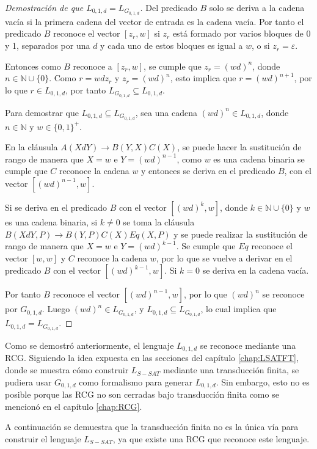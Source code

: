 \documentclass[12pt]{article}
\begin{document}
\begin{proof}[Demostración de que $L_{0,1,d}=L_{G_{0,1,d}}$]
    Del predicado $B$ solo se deriva a la cadena vacía si la primera cadena del vector de entrada es la cadena vacía. Por tanto el predicado $B$ reconoce el vector $[z_r,w]$ si $z_r$ está formado por varios bloques de 0 y 1, separados por una $d$ y cada uno de estos bloques es igual a $w$, o si $z_r=\varepsilon$.
    
    Entonces como $B$ reconoce a $[z_r,w]$, se cumple que $z_r=(wd)^n$, donde $n\in \mathbb{N}\cup \{0\}$. Como $r=wdz_r$ y $z_r=(wd)^n$, esto implica que $r=(wd)^{n+1}$, por lo que $r\in L_{0,1,d}$, por tanto $L_{G_{0,1,d}}\subseteq L_{0,1,d}$.
    
    Para demostrar que $L_{0,1,d}\subseteq L_{G_{0,1,d}}$, sea una cadena $(wd)^n\in L_{0,1,d}$, donde $n\in \mathbb{N}$ y $w \in \{0,1\}^+$.
    
    En la cláusula $A(XdY)\to B(Y,X)C(X)$, se puede hacer la sustitución de rango de manera que $X=w$ e $Y=(wd)^{n-1}$, como $w$ es una cadena binaria se cumple que $C$ reconoce la cadena $w$ y entonces se deriva en el predicado $B$, con el vector $[(wd)^{n-1},w]$.
    
    Si se deriva en el predicado $B$ con el vector $[(wd)^k,w]$, donde 
    $k\in \mathbb{N} \cup \{0\}$ y $w$ es una cadena binaria, si $k\neq 0$ se toma la cláusula
    $B(XdY,P)\to B(Y,P) C(X) Eq(X,P)$ y se puede realizar la sustitución de rango de manera que
    $X=w$ e $Y=(wd)^{k-1}$. Se cumple que $Eq$ reconoce el vector $[w,w]$ y $C$ reconoce la cadena $w$,
    por lo que se vuelve a derivar en el  predicado $B$ con el vector $[(wd)^{k-1},w]$. Si $k=0$ se deriva
    en la cadena vacía.
    
    Por tanto $B$ reconoce el vector $[(wd)^{n-1},w]$, por lo que $(wd)^n$ se reconoce por $G_{0,1,d}$. Luego
    $(wd)^n\in L_{G_{0,1,d}}$, y $L_{0,1,d}\subseteq L_{G_{0,1,d}}$, lo cual implica
    que $L_{0,1,d} = L_{G_{0,1,d}}$.
\end{proof}

Como se demostró anteriormente, el lenguaje $L_{0,1,d}$ se reconoce mediante una RCG.  Siguiendo la idea expuesta en las secciones del capítulo \ref{chap:LSATFT}, donde se muestra cómo construir $L_{S-SAT}$ mediante una transducción finita, se pudiera usar $G_{0,1,d}$ como formalismo para generar $L_{0,1,d}$. Sin embargo, esto no es posible porque las RCG no son cerradas bajo transducción finita como se mencionó en el capítulo \ref{chap:RCG}.


A continuación se demuestra que la transducción finita no es la única vía para construir el lenguaje $L_{S-SAT}$, ya que existe una RCG que reconoce este lenguaje.
\end{document}
